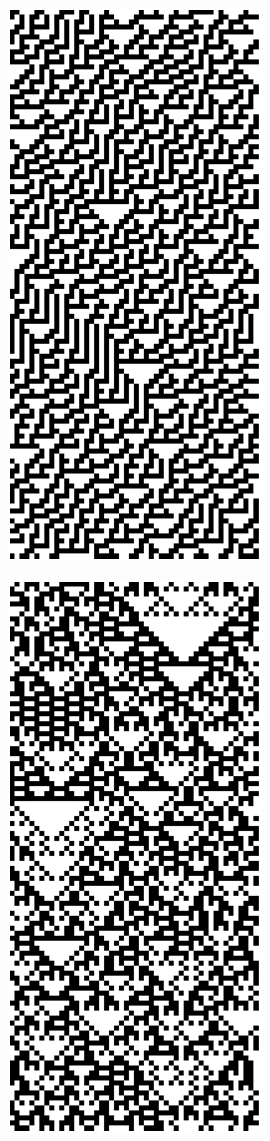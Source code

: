  \begin{figure}
	\caption{Class 3 (a,b) and 4 (c,d) elementary cellular automata}
	\label{class12}
	\centering
	\begin{subfigure}[b]{0.275\textwidth}
		\centering
		\label{fig:first}
		
		\includegraphics[scale=0.32]{./images/CA_FDM/rule30}
		\caption[]{}%
	\end{subfigure}%
	\begin{subfigure}[b]{0.275\textwidth}
		\centering
		\includegraphics[scale=0.32]{./images/CA_FDM/rule90}

\end{subfigure}
\end{figure}
